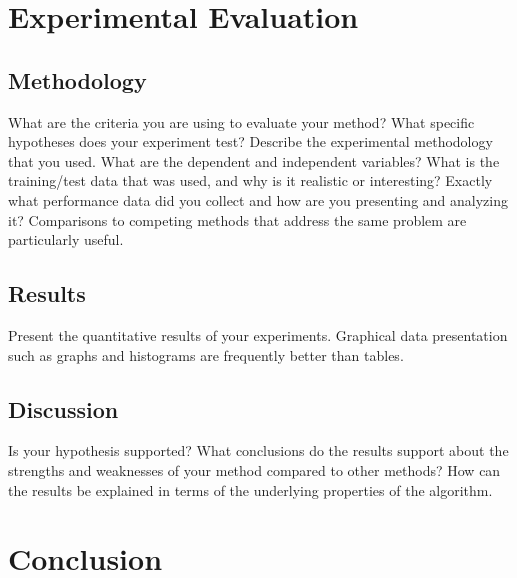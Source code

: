 \documentclass[a4paper,12pt]{article}
\begin{document}
\section{Experimental Evaluation}
\subsection{Methodology}
What are the criteria you are using to evaluate your method? What specific hypotheses does
your experiment test? Describe the experimental methodology that you used. What are the
dependent and independent variables? What is the training/test data that was used, and why
is it realistic or interesting? Exactly what performance data did you collect and how are you
presenting and analyzing it? Comparisons to competing methods that address the same
problem are particularly useful.

\subsection{Results}
Present the quantitative results of your experiments. Graphical data presentation such as graphs and histograms are frequently better than tables.

\subsection{Discussion}
Is your hypothesis supported? What conclusions do the results support about the strengths and weaknesses of your method compared to other methods? How can the results be explained in terms of the underlying properties of the algorithm.


\section{Conclusion}
\end{document}
